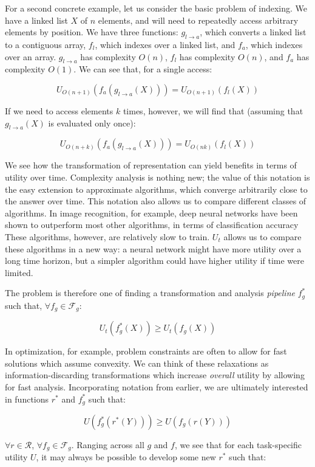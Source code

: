 \bigskip

For a second concrete example, let us consider the basic problem of indexing.
We have a linked list $X$ of $n$ elements, and will need to repeatedly access arbitrary elements by position.
We have three functions: $g_{l \rightarrow a}$, which converts a linked list to a contiguous array, $f_l$, which indexes over a linked list, and $f_a$, which indexes over an array. $g_{l \rightarrow a}$ has complexity $O(n)$, $f_l$ has complexity $O(n)$, and $f_a$ has complexity $O(1)$.
We can see that, for a single access:

\[
U_{O(n+1)}(f_a(g_{l \rightarrow a}(X))) = U_{O(n+1)}(f_l(X))
\]

If we need to access elements $k$ times, however, we will find that (assuming that $g_{l \rightarrow a}(X)$ is evaluated only once):

\[
U_{O(n+k)}(f_a(g_{l \rightarrow a}(X))) = U_{O(nk)}(f_l(X))
\]

We see how the transformation of representation can yield benefits in terms of utility over time.
Complexity analysis is nothing new; the value of this notation is the easy extension to approximate algorithms, which converge arbitrarily close to the  answer over time.
This notation also allows us to compare different classes of algorithms.
In image recognition, for example, deep neural networks have been shown to outperform most other algorithms, in terms of classification accuracy
These algorithms, however, are relatively slow to train.
$U_t$ allows us to compare these algorithms in a new way: a neural network might have more utility over a long time horizon, but a simpler algorithm could have higher utility if time were limited.

\bigskip

The problem is therefore one of finding a transformation and analysis \textit{pipeline} $f_g^*$ such that, $\forall f_g \in \mathcal{F}_g$:

\[
U_t(f_g^*(X)) \geq U_t(f_g(X))
\]

In optimization, for example, problem constraints are often  to allow for fast solutions which assume convexity.
We can think of these relaxations as information-discarding transformations which increase \textit{overall} utility by allowing for fast analysis.
Incorporating notation from earlier, we are ultimately interested in functions $r^*$ and $f_g^*$ such that:

\[
U(f_g^*(r^*(Y))) \geq U(f_g(r(Y)))
\]

$\forall r \in \mathcal{R}$,  $\forall f_g \in \mathcal{F}_g$. Ranging across all $g$ and $f$, we see that for each task-specific utility $U$, it may always be possible to develop some new $r^*$ such that:


